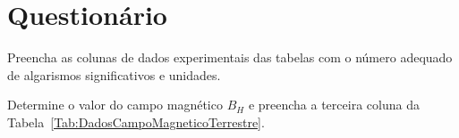\cleardoublepage


\vspace{15mm}

\begin{fullwidth}
\noindent{}
\vspace{5mm}

\noindent{}

\noindent{}

\noindent{}

\noindent{}

\noindent{}
\end{fullwidth}

\vspace{5mm}

\section{Questionário}

\begin{question}[type={exam}]
Preencha as colunas de dados experimentais das tabelas com o número adequado de algarismos significativos e unidades.
\end{question}

\begin{question}[type={exam}]
Determine o valor do campo magnético $B_H$ e preencha a terceira coluna da Tabela~\ref{Tab:DadosCampoMagneticoTerrestre}.
\end{question}

